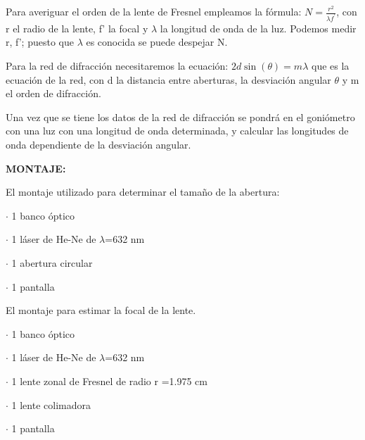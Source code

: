\documentclass[12pt,thmsa]{article}
\begin{document}
Para averiguar el orden de la lente de Fresnel empleamos la f\'{o}rmula: $N=%
\frac{r^{2}}{\lambda f^{\prime }}$, con r el radio de la lente, f' la focal
y $\lambda $ la longitud de onda de la luz. Podemos medir r, f'; puesto que $%
\lambda $ es conocida se puede despejar N.

Para la red de difracci\'{o}n necesitaremos la ecuaci\'{o}n: $2d\sin (\theta
)=m\lambda $ que es la ecuaci\'{o}n de la red, con d la distancia entre
aberturas, la desviaci\'{o}n angular $\theta $ y m el orden de
difracci\'{o}n.

Una vez que se tiene los datos de la red de difracci\'{o}n se pondr\'{a} en
el goni\'{o}metro con una luz con una longitud de onda determinada, y
calcular las longitudes de onda dependiente de la desviaci\'{o}n angular.

\textbf{MONTAJE:}

\vspace{1pt}

El montaje utilizado para determinar el tama\~{n}o de la abertura:

$\cdot$ 1 banco \'{o}ptico

$\cdot $ 1 l\'{a}ser de He-Ne de $\lambda $=632 nm

$\cdot$ 1 abertura circular

$\cdot$ 1 pantalla

\vspace{1pt}

\vspace{1pt}El montaje para estimar la focal de la lente.

$\cdot$ 1 banco \'{o}ptico

$\cdot$ 1 l\'{a}ser de He-Ne de $\lambda $=632 nm

$\cdot$ 1 lente zonal de Fresnel de radio r =1.975 cm 

$\cdot$ 1 lente colimadora

$\cdot$ 1 pantalla

\end{document}
